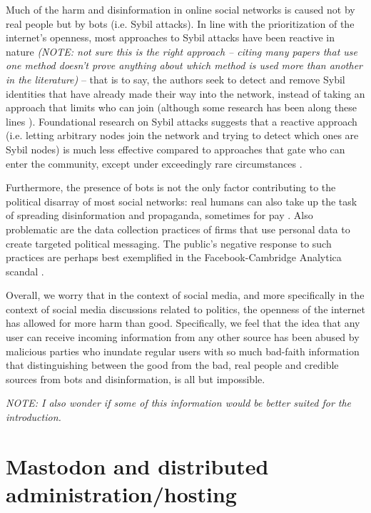 \documentclass[sigconf,authordraft]{acmart}
\begin{document}
Much of the harm and disinformation in online social networks is caused not by real people but by bots (i.e. Sybil attacks). In line with the prioritization of the internet's openness, most approaches to Sybil attacks have been reactive in nature \cite{al2017sybil,Wei2012sybildefender,boshmaf2015integro,cao2012aiding,cao2013sybilfence,shi2013sybilshield, danezis2009sybilinfer,yang2014uncovering,wang2012social,varol2017online, lingam2018detection}\textit{(NOTE: not sure this is the right approach -- citing many papers that use one method doesn't prove anything about which method is used more than another in the literature)} -- that is to say, the authors seek to detect and remove Sybil identities that have already made their way into the network, instead of taking an approach that limits who can join (although some research has been along these lines \cite{yu2006sybilguard,yu2008sybillimit,Tran2011Gatekeeper}). Foundational research on Sybil attacks suggests that a reactive approach (i.e. letting arbitrary nodes join the network and trying to detect which ones are Sybil nodes) is much less effective compared to approaches that gate who can enter the community, except under exceedingly rare circumstances \cite{douceur2002sybil}. 

Furthermore, the presence of bots is not the  only factor contributing to the political disarray of most social networks: real humans can also take up the task of spreading disinformation and propaganda, sometimes for pay \cite{bradshaw2017troops}. Also problematic are the data collection practices of firms that use personal data to create targeted political messaging. The public's negative response to such practices are perhaps best exemplified in the Facebook-Cambridge Analytica scandal \cite{CambridgeAnalyticaNYT}.

Overall, we worry that in the context of social media, and more specifically in the context of social media discussions related to politics, the openness of the internet has allowed for more harm than good. Specifically, we feel that the idea that any user can receive incoming information from any other source has been abused by malicious parties who inundate regular users with so much bad-faith information that distinguishing between the good from the bad, real people and credible sources from bots and disinformation, is all but impossible.  


\textit{NOTE: I also wonder if some of this information would be better suited for the introduction.}

\section{Mastodon and distributed administration/hosting}
\end{document}
